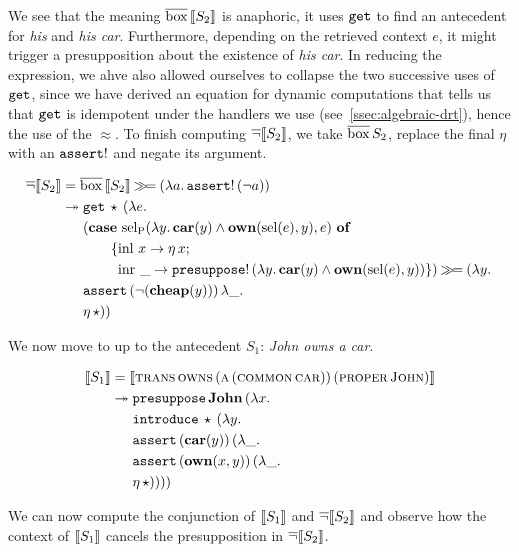 We see that the meaning $\overline{\mathrm{box}}\,\llbracket S_2 \rrbracket$ is anaphoric, it uses
$\mathtt{get}$ to find an antecedent for \emph{his} and \emph{his
  car}. Furthermore, depending on the retrieved context $e$, it might
trigger a presupposition about the existence of \emph{his car}. In reducing
the expression, we ahve also allowed ourselves to collapse the two
successive uses of $\mathtt{get}$, since we have derived an equation for
dynamic computations that tells us that $\mathtt{get}$ is idempotent under the
handlers we use (see~\ref{ssec:algebraic-drt}), hence the use of the
$\approx$. To finish computing $\mathop{\overline{\lnot}} \llbracket S_2 \rrbracket$, we take
$\overline{\mathrm{box}}\,S_2$, replace the final $\eta$ with an $\mathtt{assert}!$ and
negate its argument.

\begin{align*}
  \mathop{\overline{\lnot}} \llbracket S_2 \rrbracket
  &= \overline{\mathrm{box}}\,\llbracket S_2 \rrbracket \mathbin{\gg\!=} (\lambda a.\, \mathtt{assert}!\,(\lnot a)) \\
  &\twoheadrightarrow \begin{aligned}[t]
    &\mathtt{get}\,\star\,(\lambda e.\,  \\
    &(\text{\textbf{case} $\operatorname{sel_P}(\lambda y.\, \textbf{car}(y) \land \textbf{own}(\operatorname{sel}(e), y), e)$ \textbf{of}} \\ &\qquad \{\operatorname{inl}\,x \to \eta\,x; \\ &\qquad \ \operatorname{inr}\,\_ \to \mathtt{presuppose}!\,(\lambda y.\, \textbf{car}(y) \land \textbf{own}(\operatorname{sel}(e), y)) \}) \mathbin{\gg\!=} (\lambda y.\,  \\
    &\mathtt{assert}\,(\lnot (\textbf{cheap}(y)))\,\lambda \_.\,  \\
    &\eta\,\star))
    \end{aligned}
\end{align*}

We now move to up to the antecedent $S_1$: \emph{John owns a car}.

\begin{align*}
  \llbracket S_1 \rrbracket
  &= \llbracket \textsc{trans}\,\textsc{owns}\,(\textsc{a}\,(\textsc{common}\,\textsc{car}))\,(\textsc{proper}\,\textsc{John}) \rrbracket \\
  &\twoheadrightarrow \begin{aligned}[t]
      &\mathtt{presuppose}\,\textbf{John}\,(\lambda x.\,  \\
      &\mathtt{introduce}\,\star\,(\lambda y.\,  \\
      &\mathtt{assert}\,(\textbf{car}(y))\,(\lambda \_.\,  \\
      &\mathtt{assert}\,(\textbf{own}(x, y))\,(\lambda \_.\,  \\
      &\eta\,\star))))
    \end{aligned}
\end{align*}

We can now compute the conjunction of $\llbracket S_1 \rrbracket$ and $\mathop{\overline{\lnot}} \llbracket S_2 \rrbracket$ and
observe how the context of $\llbracket S_1 \rrbracket$ cancels the presupposition in
$\mathop{\overline{\lnot}} \llbracket S_2 \rrbracket$.

